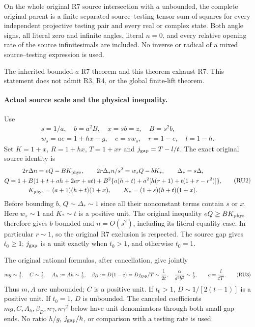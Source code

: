 \begin{theorem}
On the whole original R7 source intersection with $a$ unbounded,
the complete original parent is a finite separated source--testing
tensor sum of squares for every independent projective testing pair
and every real or complex state. Both angle signs, all literal zero
and infinite angles, literal $n=0$, and every relative opening rate
of the source infinitesimals are included. No inverse or radical of
a mixed source--testing expression is used.
\end{theorem}

The inherited bounded-$a$ R7 theorem and this theorem exhaust R7.
This statement does not admit R3, R4, or the global finite-lift theorem.

\paragraph{Actual source scale and the physical inequality.}
Use
\[
 \begin{gathered}
 s=1/a,\quad b=a^2B,\quad x=sb=z,\quad B=s^2b,\\
 w_s=ae=1+hx-g,\quad e=sw_s,\quad r=1-e,\quad l=1-h.
 \end{gathered}
 \tag{RU1}
\]
Set $K=1+x$, $R=1+hx$, $T=1+xr$ and
$j_{\rm gap}=T-l/t$. The exact original source identity is
\[
\begin{gathered}
 2r\Delta n=eQ-BK_{\rm phys},\qquad
 2r\Delta_*n/s^2=w_sQ-bK_*,\qquad \Delta_*=s\Delta,\\
 Q=1+B(1+t+ah+2ar+at)
    +B^2\{a(h+t)+a^2[h(r+1)+t(1+r-r^2)]\},\\
 K_{\rm phys}=(a+1)(h+t)(1+x),\qquad
 K_*=(1+s)(h+t)(1+x).
\end{gathered}                                                     \tag{RU2}
\]
Before bounding $b$, $Q\sim\Delta_*\sim1$ since all their nonconstant
terms contain $s$ or $x$. Here $w_s\sim1$ and $K_*\sim t$ is a
positive unit. The original inequality $eQ\ge BK_{\rm phys}$
therefore gives $b$ bounded and $n=O(s^2)$, including its literal
equality case. In particular $r\sim1$, so the original R7 exclusion
is respected. The source gap gives $t_0\ge1$; $j_{\rm gap}$ is a
unit exactly when $t_0>1$, and otherwise $t_0=1$.

The original rational formulas, after cancellation, give jointly
\[
 mg\sim\tfrac12,\quad C\sim\tfrac t2,\quad
 A_h:=Ah\sim\tfrac t2,\quad
 \beta_D:=D(1-c)=Dj_{\rm gap}/T\sim\frac1{2t},
 \quad \frac\alpha{s^3b^2}\sim\tfrac t2,
 \qquad c=\frac l{tT}.
 \tag{RU3}
\]
Thus $m,A$ are unbounded; $C$ is a positive unit. If $t_0>1$,
$D\sim1/[2(t-1)]$ is a positive unit. If $t_0=1$, $D$ is unbounded.
The canceled coefficients $mg,C,A_h,\beta_D,n\gamma,n\gamma^2$
below have unit denominators through both small-gap ends. No ratio
$h/g$, $j_{\rm gap}/h$, or comparison with a testing rate is used.

